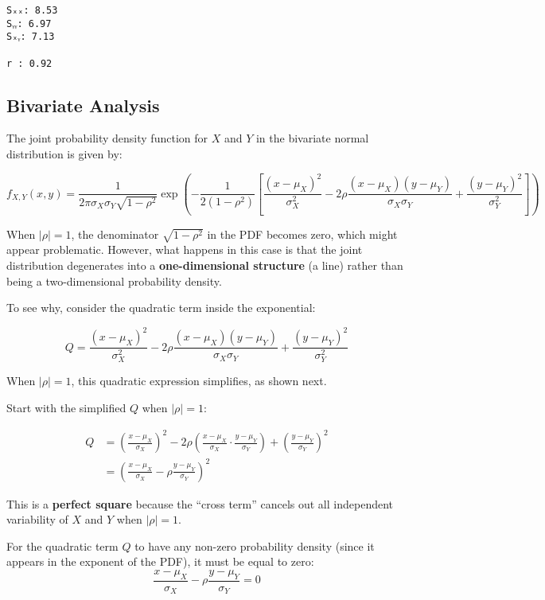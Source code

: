 \documentclass[
  letterpaper,
  DIV=11,
  numbers=noendperiod]{scrartcl}
\begin{document}
\begin{verbatim}
Sₓₓ: 8.53
Sᵧᵧ: 6.97
Sₓᵧ: 7.13
 
r : 0.92
\end{verbatim}

\subsection{Bivariate Analysis}\label{bivariate-analysis}

The joint probability density function for \(X\) and \(Y\) in the
bivariate normal distribution is given by:

\[
f_{X,Y}(x, y) = \frac{1}{2\pi \sigma_X \sigma_Y \sqrt{1-\rho^2}} 
\exp\left( -\frac{1}{2(1-\rho^2)} \left[ \frac{(x-\mu_X)^2}{\sigma_X^2} - 2\rho\frac{(x-\mu_X)(y-\mu_Y)}{\sigma_X \sigma_Y} + \frac{(y-\mu_Y)^2}{\sigma_Y^2} \right] \right)
\]

When \(|\rho| = 1\), the denominator \(\sqrt{1-\rho^2}\) in the PDF
becomes zero, which might appear problematic. However, what happens in
this case is that the joint distribution degenerates into a
\textbf{one-dimensional structure} (a line) rather than being a
two-dimensional probability density.

To see why, consider the quadratic term inside the exponential:

\[
Q = \frac{(x-\mu_X)^2}{\sigma_X^2} - 2\rho \frac{(x-\mu_X)(y-\mu_Y)}{\sigma_X \sigma_Y} + \frac{(y-\mu_Y)^2}{\sigma_Y^2}
\]

When \(|\rho| = 1\), this quadratic expression simplifies, as shown
next.

Start with the simplified \(Q\) when \(|\rho| = 1\):

\begin{align*}
Q &= \left( \frac{x-\mu_X}{\sigma_X} \right)^2 - 2\rho \left( \frac{x-\mu_X}{\sigma_X} \cdot \frac{y-\mu_Y}{\sigma_Y} \right) + \left( \frac{y-\mu_Y}{\sigma_Y} \right)^2\\
&=\left( \frac{x-\mu_X}{\sigma_X} - \rho \frac{y-\mu_Y}{\sigma_Y} \right)^2
\end{align*}

This is a \textbf{perfect square} because the ``cross term'' cancels out
all independent variability of \(X\) and \(Y\) when \(|\rho| = 1\).

For the quadratic term \(Q\) to have any non-zero probability density
(since it appears in the exponent of the PDF), it must be equal to zero:
\[
\frac{x-\mu_X}{\sigma_X} - \rho \frac{y-\mu_Y}{\sigma_Y} = 0
\]
\end{document}
